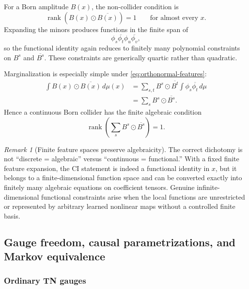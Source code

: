 \documentclass[11pt]{article}
\theoremstyle{remark}
\newtheorem{remark}[definition]{Remark}
\newcommand{\rank}{\operatorname{rank}}
\newcommand{\odotc}{\mathbin{\odot}}
\begin{document}
For a Born amplitude $B(x)$, the non-collider condition is
\begin{equation}
\rank\!\left(B(x)\odotc\overline{B(x)}\right)=1
\qquad\text{for almost every }x.
\label{eq:continuous-born-chain}
\end{equation}
Expanding the minors produces functions in the finite span of
\begin{equation}
\phi_s\overline{\phi_t}\phi_u\overline{\phi_v},
\end{equation}
so the functional identity again reduces to finitely many polynomial constraints on $B^s$ and $\overline{B^s}$. These constraints are generically quartic rather than quadratic.

Marginalization is especially simple under \cref{eq:orthonormal-features}:
\begin{align}
\int B(x)\odotc\overline{B(x)}\,d\mu(x)
&=\sum_{s,t}B^s\odotc\overline{B^t}
\int\phi_s\overline{\phi_t}\,d\mu\nonumber\\
&=\sum_s B^s\odotc\overline{B^s}.
\label{eq:born-continuous-marginal}
\end{align}
Hence a continuous Born collider has the finite algebraic condition
\begin{equation}
\rank\!\left(\sum_s B^s\odotc\overline{B^s}\right)=1.
\end{equation}

\begin{remark}[Finite feature spaces preserve algebraicity]
The correct dichotomy is not ``discrete = algebraic'' versus ``continuous = functional.'' With a fixed finite feature expansion, the CI statement is indeed a functional identity in $x$, but it belongs to a finite-dimensional function space and can be converted exactly into finitely many algebraic equations on coefficient tensors. Genuine infinite-dimensional functional constraints arise when the local functions are unrestricted or represented by arbitrary learned nonlinear maps without a controlled finite basis.
\end{remark}

\subsection{Gauge freedom, causal parametrizations, and Markov equivalence}
\label{sec:gauge}

\subsubsection{Ordinary TN gauges}
\end{document}
